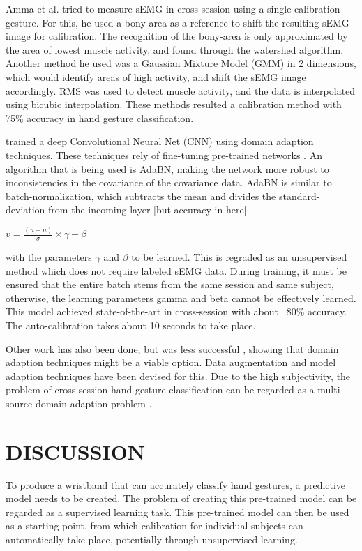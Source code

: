 \documentclass{article}
\begin{document}
Amma et al. \cite{Amma2015} tried to measure sEMG in cross-session using a single calibration gesture. For this, he used a bony-area as a reference to shift the resulting sEMG image for calibration. The recognition of the bony-area is only approximated by the area of lowest muscle activity, and found through the watershed algorithm. Another method he used was a Gaussian Mixture Model (GMM) in 2 dimensions, which would identify areas of high activity, and shift the sEMG image accordingly. RMS was used to detect muscle activity, and the data is interpolated using bicubic interpolation. These methods resulted a calibration method with 75\% accuracy in hand gesture classification. 

\cite{Du2017} trained a deep Convolutional Neural Net (CNN) using domain adaption \cite{Patel2015} techniques. These techniques rely of fine-tuning pre-trained networks \cite{Donahue2014a} . An algorithm that is being used is AdaBN, making the network more robust to inconsistencies in the covariance of the covariance data. AdaBN is similar to batch-normalization, which subtracts the mean and divides the standard-deviation  from the incoming layer [but accuracy in here]

\begin{center}
\( v = \frac{(u - \mu)}{\sigma} \times \gamma + \beta \)
\end{center}

with the parameters $ \gamma $ and $ \beta $ to be learned. This is regraded as an unsupervised method which does not require labeled sEMG data. During training, it must be ensured that the entire batch stems from the same session and same subject, otherwise, the learning parameters gamma and beta cannot be effectively learned. This model achieved state-of-the-art in cross-session with about ~80\% accuracy. The auto-calibration takes about 10 seconds to take place.

Other work has also been done, but was less successful \cite{Patricia2014a} \cite{Ju2000} \cite{Khushaba2014a}, showing that domain adaption techniques might be a viable option. Data augmentation \cite{Hargrove2008a}  \cite{Boschmann2012} and model adaption techniques \cite{Amma2015} \cite{Patricia2014a} \cite{Ju2000} \cite{Khushaba2014a} have been devised for this. Due to the high subjectivity, the problem of cross-session hand gesture classification can be regarded as a multi-source domain adaption problem \cite{Patel2015}. 


\section{DISCUSSION}
To produce a wristband that can accurately classify hand gestures, a predictive model needs to be created. The problem of creating this pre-trained model can be regarded as a supervised learning task. This pre-trained model can then be used as a starting point, from which calibration for individual subjects can automatically take place, potentially through unsupervised learning.
\end{document}
